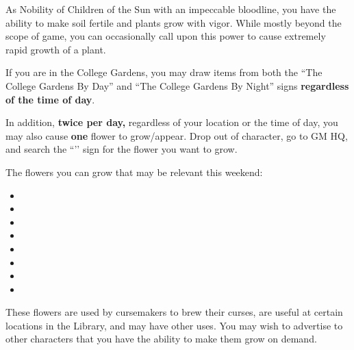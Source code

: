\documentclass[green]{GL2020}
\begin{document}
\name{\gFlowerPower{}}

As Nobility of Children of the Sun with an impeccable bloodline, you have the ability to make soil fertile and plants grow with vigor. While mostly beyond the scope of game, you can occasionally call upon this power to cause extremely rapid growth of a plant. 

If you are in the College Gardens, you may draw items from both the ``The College Gardens By Day'' and ``The College Gardens By Night'' signs \textbf{regardless of the time of day}.

In addition, \textbf{twice per day,} regardless of your location or the time of day, you may also cause \textbf{one} flower to grow/appear. Drop out of character, go to GM HQ, and search the ``\sFlowerPower{}’’ sign for the flower you want to grow.

The flowers you can grow that may be relevant this weekend:
\begin{itemize}
	\item \iBlackCrocus{}
	\item \iFlameOrchid{}
	\item \iHollyhock{}
	\item \iLily{}
	\item \iMoonflower{}
	\item \iSunflower{}
	\item \iNightshade{}
	\item \iMorningGlory{}
\end{itemize}

These flowers are used by cursemakers to brew their curses, are useful at certain locations in the Library, and may have other uses. You may wish to advertise to other characters that you have the ability to make them grow on demand.
\end{document}
